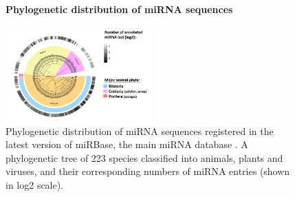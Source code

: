 \begin{figure}[ht!]
	  \centering
	  \caption{\textbf{Phylogenetic distribution of miRNA sequences}}
	    \includegraphics[width=0.5\textwidth]{background figures/evolution.jpg}
    	\caption*{Phylogenetic distribution of miRNA sequences registered in the latest version of miRBase, the main miRNA database \cite{mirbase1}. A phylogenetic tree of 223 species classified into animals, plants and viruses, and their corresponding numbers of miRNA entries (shown in log2 scale).}
    	\label{evo_fig}
\end{figure}


